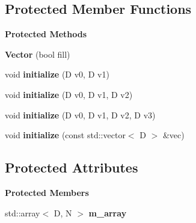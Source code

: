 \subsection*{Protected Member Functions}
\begin{Indent}\textbf{ Protected Methods}\par
\begin{DoxyCompactItemize}
\item 
\mbox{\label{classrev_1_1_vector_a21cd2ce732fcd6b6ac17f05d65b64b13}} 
{\bfseries Vector} (bool fill)
\item 
\mbox{\label{classrev_1_1_vector_a35458124b724d366e8f8a46796ea3cde}} 
void {\bfseries initialize} (D v0, D v1)
\item 
\mbox{\label{classrev_1_1_vector_afac6541ea66e12e50fab32392869aa45}} 
void {\bfseries initialize} (D v0, D v1, D v2)
\item 
\mbox{\label{classrev_1_1_vector_ab7500d2c04d4098caeb6a56c2a81c212}} 
void {\bfseries initialize} (D v0, D v1, D v2, D v3)
\item 
\mbox{\label{classrev_1_1_vector_aa54afc904b15a3c23559b883c17a9a02}} 
void {\bfseries initialize} (const std\+::vector$<$ D $>$ \&vec)
\end{DoxyCompactItemize}
\end{Indent}
\subsection*{Protected Attributes}
\begin{Indent}\textbf{ Protected Members}\par
\begin{DoxyCompactItemize}
\item 
\mbox{\label{classrev_1_1_vector_a680f1a1d8bd21b474e88d432ca186b5a}} 
std\+::array$<$ D, N $>$ {\bfseries m\+\_\+array}
\end{DoxyCompactItemize}
\end{Indent}
